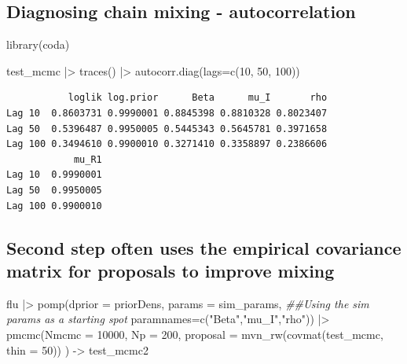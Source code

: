 \documentclass[
  letterpaper,
  DIV=11,
  numbers=noendperiod]{scrartcl}
\newenvironment{Shaded}{\begin{snugshade}}{\end{snugshade}}
\newcommand{\AttributeTok}[1]{\textcolor[rgb]{0.40,0.45,0.13}{#1}}
\newcommand{\DecValTok}[1]{\textcolor[rgb]{0.68,0.00,0.00}{#1}}
\newcommand{\DocumentationTok}[1]{\textcolor[rgb]{0.37,0.37,0.37}{\textit{#1}}}
\newcommand{\FunctionTok}[1]{\textcolor[rgb]{0.28,0.35,0.67}{#1}}
\newcommand{\NormalTok}[1]{\textcolor[rgb]{0.00,0.23,0.31}{#1}}
\newcommand{\OtherTok}[1]{\textcolor[rgb]{0.00,0.23,0.31}{#1}}
\newcommand{\SpecialCharTok}[1]{\textcolor[rgb]{0.37,0.37,0.37}{#1}}
\newcommand{\StringTok}[1]{\textcolor[rgb]{0.13,0.47,0.30}{#1}}
\begin{document}
\hypertarget{diagnosing-chain-mixing---autocorrelation}{%
\subsection{Diagnosing chain mixing -
autocorrelation}\label{diagnosing-chain-mixing---autocorrelation}}

\begin{Shaded}
\begin{Highlighting}[]
\FunctionTok{library}\NormalTok{(coda)}

\NormalTok{test\_mcmc }\SpecialCharTok{|\textgreater{}} 
  \FunctionTok{traces}\NormalTok{() }\SpecialCharTok{|\textgreater{}}  
  \FunctionTok{autocorr.diag}\NormalTok{(}\AttributeTok{lags=}\FunctionTok{c}\NormalTok{(}\DecValTok{10}\NormalTok{, }\DecValTok{50}\NormalTok{, }\DecValTok{100}\NormalTok{))}
\end{Highlighting}
\end{Shaded}

\begin{verbatim}
           loglik log.prior      Beta      mu_I       rho
Lag 10  0.8603731 0.9990001 0.8845398 0.8810328 0.8023407
Lag 50  0.5396487 0.9950005 0.5445343 0.5645781 0.3971658
Lag 100 0.3494610 0.9900010 0.3271410 0.3358897 0.2386606
            mu_R1
Lag 10  0.9990001
Lag 50  0.9950005
Lag 100 0.9900010
\end{verbatim}

\hypertarget{second-step-often-uses-the-empirical-covariance-matrix-for-proposals-to-improve-mixing}{%
\subsection{Second step often uses the empirical covariance matrix for
proposals to improve
mixing}\label{second-step-often-uses-the-empirical-covariance-matrix-for-proposals-to-improve-mixing}}

\begin{Shaded}
\begin{Highlighting}[]
\NormalTok{flu }\SpecialCharTok{|\textgreater{}} 
  \FunctionTok{pomp}\NormalTok{(}\AttributeTok{dprior =}\NormalTok{ priorDens,}
       \AttributeTok{params =}\NormalTok{ sim\_params, }\DocumentationTok{\#\#Using the sim params as a starting spot}
       \AttributeTok{paramnames=}\FunctionTok{c}\NormalTok{(}\StringTok{"Beta"}\NormalTok{,}\StringTok{"mu\_I"}\NormalTok{,}\StringTok{"rho"}\NormalTok{)) }\SpecialCharTok{|\textgreater{}} 
  \FunctionTok{pmcmc}\NormalTok{(}\AttributeTok{Nmcmc =} \DecValTok{10000}\NormalTok{, }
        \AttributeTok{Np =} \DecValTok{200}\NormalTok{,}
        \AttributeTok{proposal =} \FunctionTok{mvn\_rw}\NormalTok{(}\FunctionTok{covmat}\NormalTok{(test\_mcmc, }\AttributeTok{thin =} \DecValTok{50}\NormalTok{))}
\NormalTok{  ) }\OtherTok{{-}\textgreater{}}\NormalTok{ test\_mcmc2}
\end{Highlighting}
\end{Shaded}
\end{document}
